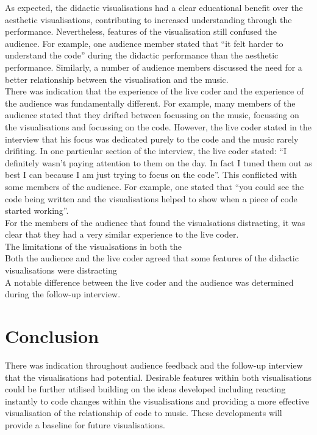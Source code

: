 \documentclass[12pt]{article}
\begin{document}
As expected, the didactic visualisations had a clear educational benefit over the aesthetic visualisations, contributing to increased understanding through the performance. Nevertheless, features of the visualisation still confused the audience. For example, one audience member stated that ``it felt harder to understand the code'' during the didactic performance than the aesthetic performance. Similarly, a number of audience members discussed the need for a better relationship between the visualisation and the music.\\

There was indication that the experience of the live coder and the experience of the audience was fundamentally different. For example, many members of the audience stated that they drifted between focussing on the music, focussing on the visualisations and focussing on the code. However, the live coder stated in the interview that his focus was dedicated purely to the code and the music rarely drifiting. In one particular section of the interview, the live coder stated: ``I definitely wasn't paying attention to them on the day. In fact I tuned them out as best I can because I am just trying to focus on the code''. This conflicted with some members of the audience. For example, one stated that ``you could see the code being written and the visualisations helped to show when a piece of code started working''.\\

For the members of the audience that found the visualsations distracting, it was clear that they had a very similar experience to the live coder.\\





The limitations of the visualsations in both the \\


Both the audience and the live coder agreed that some features of the didactic visualisations were distracting\\

A notable difference between the live coder and the audience was determined during the follow-up interview. \\


\section{Conclusion}

There was indication throughout audience feedback and the follow-up interview that the visualisations had potential. Desirable features within both visualisations could be further utilised building on the ideas developed including reacting instantly to code changes within the visualisations and providing a more effective visualisation of the relationship of code to music. These developments will provide a baseline for future visualisations. \\
\end{document}
